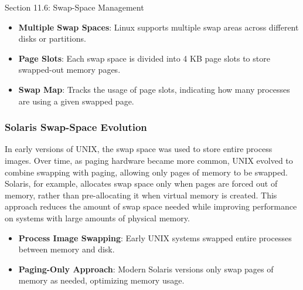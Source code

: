\begin{notes}{Section 11.6: Swap-Space Management}
    \begin{highlight}
    
        \begin{itemize}
            \item \textbf{Multiple Swap Spaces}: Linux supports multiple swap areas across different disks or partitions.
            \item \textbf{Page Slots}: Each swap space is divided into 4 KB page slots to store swapped-out memory pages.
            \item \textbf{Swap Map}: Tracks the usage of page slots, indicating how many processes are using a given swapped page.
        \end{itemize}
    
    \end{highlight}
    
    \subsubsection*{Solaris Swap-Space Evolution}
    
    In early versions of UNIX, the swap space was used to store entire process images. Over time, as paging hardware became more common, UNIX evolved to combine swapping with paging, allowing only 
    pages of memory to be swapped. Solaris, for example, allocates swap space only when pages are forced out of memory, rather than pre-allocating it when virtual memory is created. This approach 
    reduces the amount of swap space needed while improving performance on systems with large amounts of physical memory.
    
    \begin{highlight}
    
        \begin{itemize}
            \item \textbf{Process Image Swapping}: Early UNIX systems swapped entire processes between memory and disk.
            \item \textbf{Paging-Only Approach}: Modern Solaris versions only swap pages of memory as needed, optimizing memory usage.
        \end{itemize}
    
    \end{highlight}
    
    \begin{highlight}
    

\end{highlight}
\end{notes}
